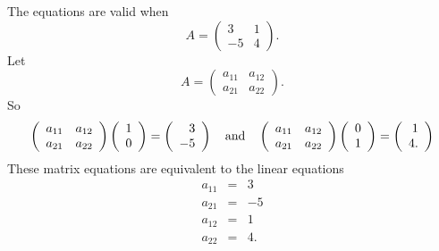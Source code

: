 \ans The equations are valid when
\[ A = \left(\begin{array}{rr} 3 & 1 \\ -5 & 4\end{array}\right). \]
\soln Let
\[ A = \left(\begin{array}{rr} a_{11} & a_{12} \\ a_{21} & 
a_{22}\end{array}\right). \]
So
\[ \left(\begin{array}{rr} a_{11} & a_{12} \\ a_{21} & a_{22}\end{array}\right)
\left(\begin{array}{r} 1 \\ 0\end{array}\right) =
\left(\begin{array}{r} 3 \\ -5\end{array}\right) \quad\mbox{and}\quad
\left(\begin{array}{rr} a_{11} & a_{12} \\ a_{21} & a_{22}\end{array}\right)
\left(\begin{array}{r} 0 \\ 1\end{array}\right) =
\left(\begin{array}{r} 1 \\ 4.\end{array}\right) \]
These matrix equations are equivalent to the linear equations
\[ \begin{array}{rcl}
a_{11} & = & 3 \\
a_{21} & = & -5 \\
a_{12} & = & 1 \\
a_{22} & = & 4.\end{array} \]


